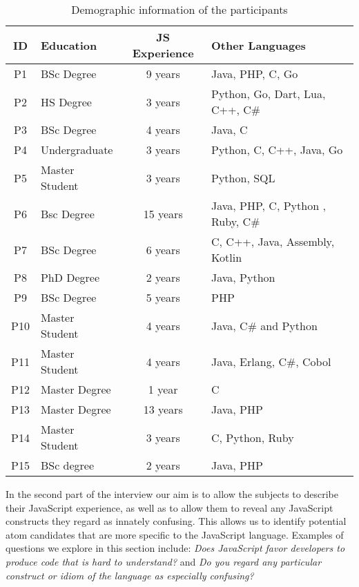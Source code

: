 \begin{table}[htb!]
  
  \centering
  \caption{Demographic information of the participants}
\begin{scriptsize}  
\begin{tabular}{clcl}
\toprule
ID & Education & JS Experience & Other Languages \\ \midrule 
P1 & BSc Degree & 9 years & Java, PHP, C, Go  
\\ 
P2 & HS Degree & 3 years & Python, Go, Dart, Lua, C++, C\#
\\ 
P3 & BSc Degree & 4 years & Java, C
\\ 
P4 & Undergraduate & 3 years & Python, C, C++, Java, Go
\\ 
P5 & Master Student & 3 years & Python, SQL
\\ 
P6 & Bsc Degree & 15  years  & Java, PHP, C, Python , Ruby, C\#
\\ 
P7 & BSc Degree  & 6 years & C, C++, Java, Assembly, Kotlin
\\ 
P8 & PhD Degree & 2 years & Java, Python
\\ 
P9 & BSc Degree  & 5 years & PHP
\\ 
P10 & Master Student & 4 years & Java, C\# and Python
\\ 
P11 & Master Student & 4 years & Java, Erlang, C\#, Cobol
\\ 
P12 & Master Degree & 1 year & C
\\ 
P13 & Master Degree & 13 years & Java, PHP
\\ 
P14 & Master Student & 3 years & C, Python, Ruby
\\ 
P15 &  BSc degree  & 2 years & Java, PHP
\\ \bottomrule
\end{tabular}
\end{scriptsize}
    \label{pinterview}
\end{table}

In the second part of the interview our aim is to allow the subjects to describe their JavaScript experience, as well as to allow them to reveal any JavaScript constructs they regard as innately confusing. This allows us to identify potential atom candidates that are more specific to the JavaScript language. Examples of questions we explore in this section include: \emph{Does JavaScript favor developers to produce code that is hard to understand?} and \emph{Do you regard any particular construct or idiom of the language as especially confusing?}

